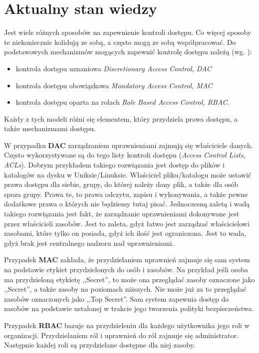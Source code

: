 \documentclass{classrep}
\begin{document}
\section{Aktualny stan wiedzy}
Jest wiele różnych sposobów na zapewnienie kontroli dostępu. Co więcej sposoby te niekoniecznie kolidują ze sobą, a często mogą ze sobą współpracować. Do podstawowych mechanizmów
mogących zapewnić kontrolę dostępu należą (wg. \cite{owasp}\cite{computer}\cite{wikibooks}):
\begin{itemize}
\item kontrola dostępu uznaniowa \textit{Discretionary Access Control, DAC}
\item kontrola dostępu obowiązkowa \textit{Mandatory Access Control, MAC}
\item kontrola dostępu oparta na rolach \textit{Role Based Access Control, RBAC}.
\end{itemize}
Każdy z tych modeli różni się elementem, który przydziela prawa dostępu, a także mechanizmami dostępu\cite{wikibooks}. 

W przypadku \textbf{DAC} zarządzaniem uprawnieniami zajmują się właściciele danych. Często wykorzystywane są do tego listy kontroli dostępu (\textit{Access Control Lists, ACLs}).
Dobrym przykładem takiego rozwiązania jest dostęp do plików i katalogów na dysku w Uniksie/Linuksie. Właściciel pliku/katalogu może ustawić prawa dostępu dla siebie, grupy, do której należy
dany plik, a także dla osób spoza grupy. Prawa te, to prawa odczytu, zapisu i wykonywania, a także pewne dodatkowe prawa o których nie będziemy tutaj pisać. Jednoczesną zaletą i wadą takiego
rozwiązania jest fakt, że zarządzanie uprawnieniami dokonywane jest przez właścicieli zasobów. Jest to zaleta, gdyż łatwo jest zarządzać właścicielowi zasobami, które tylko on posiada,
gdyż ich ilość jest ograniczona. Jest to wada, gdyż brak jest centralnego nadzoru nad uprawnieniami.

Przypadek \textbf{MAC} zakłada, że przydzielaniem uprawnień zajmuje się sam system na podstawie etykiet przydzielonych do osób i zasobów. Na przykład jeśli osoba ma przydzieloną
etykietę ,,Secret'', to może ona przeglądać zasoby oznaczone jako ,,Secret'', a także zasoby na poziomach niższych. Nie może już za to przeglądać zasobów oznaczonych jako ,,Top Secret''.
Sam system zapewnia dostęp do zasobów na podstawie ustalonej w trakcie jego tworzenia polityki bezpieczeństwa.

Przypadek \textbf{RBAC} bazuje na przydzieleniu dla każdego użytkownika jego roli w organizacji. Przydzielaniem ról i uprawnień do ról zajmuje się administrator. Następnie każdej roli
są przydzielane dostępne dla niej zasoby.
\end{document}
